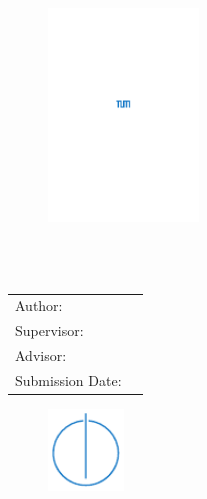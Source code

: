 \begin{titlepage}
  \centering

  \vspace{20mm}
	  \begin{figure}
	\centering
	\hspace{15mm}
		\includegraphics[width=40mm]{logos/tum.pdf}
  \end{figure}
  

  {\huge\MakeUppercase{\getFaculty{}}}\\

  \vspace{5mm}
  {\large\MakeUppercase{\getUniversity{}}}\\

  \vspace{10mm}
  {\Large \getDoctype{}}

  \vspace{10mm}
  {\huge\bfseries \getTitle{}}

  \vspace{10mm}
  {\huge\bfseries \getTitleGer{}}

  \vspace{10mm}
  \begin{tabular}{l l}
    Author: & \getAuthor{} \\
    Supervisor: & \getSupervisor{} \\
    Advisor: & \getAdvisor{} \\
    Submission Date: & \getSubmissionDate{} \\
  \end{tabular}

  \vspace{10mm}
	  \begin{figure}[h]
	\centering
	\hspace{40mm}
		\includegraphics[width=20mm]{logos/faculty.pdf}
  \end{figure}
\end{titlepage}
